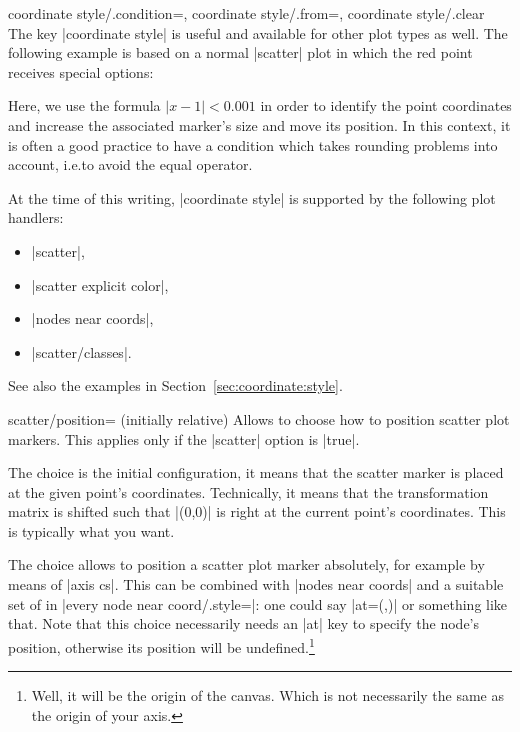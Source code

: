 {\begin{pgfplotskeylist}{%
    coordinate style/.condition=,
    coordinate style/.from=,
    coordinate style/.clear%
}
    The key |coordinate style| is useful and available for other plot types as
    well. The following example is based on a normal |scatter| plot in which
    the red point receives special options:
\begin{codeexample}[]
\end{codeexample}
    Here, we use the formula $\lvert x-1 \rvert < 0.001$ in order to identify
    the point coordinates and increase the associated marker's size and move
    its position. In this context, it is often a good practice to have a
    condition which takes rounding problems into account, i.e.\@ to avoid the
    equal operator.

    At the time of this writing, |coordinate style| is supported by the
    following plot handlers:
    \begin{itemize}
        \item |scatter|,
        \item |scatter explicit color|,
        \item |nodes near coords|,
        \item |scatter/classes|.
    \end{itemize}
    See also the examples in Section~\ref{sec:coordinate:style}.
\end{pgfplotskeylist}

\begin{pgfplotskey}{scatter/position= (initially relative)}
    Allows to choose how to position scatter plot markers. This applies only if
    the |scatter| option is |true|.

    The choice  is the initial configuration, it means
    that the scatter marker is placed at the given point's coordinates.
    Technically, it means that the transformation matrix is shifted such that
    |(0,0)| is right at the current point's coordinates. This is typically what
    you want.

    The choice  allows to position a scatter plot marker
    absolutely, for example by means of |axis cs|. This can be combined with
    |nodes near coords| and a suitable set of  in
    |every node near coord/.style=|: one could say
    |at={(\coordindex,)}| or something like that. Note that this
    choice necessarily needs an |at| key to specify the node's position,
    otherwise its position will be undefined.\footnote{Well, it will be the
    origin of the canvas. Which is not necessarily the same as the origin of
    your axis.}
\end{pgfplotskey}

}
